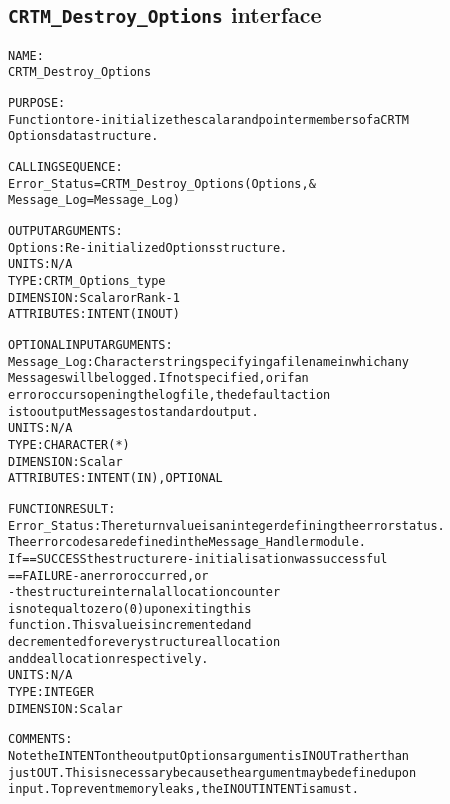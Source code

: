 \subsection{\texttt{CRTM\_Destroy\_Options} interface}
  \label{sec:CRTM_Destroy_Options_interface}
  \begin{alltt}
 
  NAME:
        CRTM_Destroy_Options
  
  PURPOSE:
        Function to re-initialize the scalar and pointer members of a CRTM
        Options data structure.
 
  CALLING SEQUENCE:
        Error_Status = CRTM_Destroy_Options( Options                , &
                                             Message_Log=Message_Log  )
  
  OUTPUT ARGUMENTS:
        Options:      Re-initialized Options structure.
                      UNITS:      N/A
                      TYPE:       CRTM_Options_type
                      DIMENSION:  Scalar or Rank-1
                      ATTRIBUTES: INTENT(IN OUT)
 
  OPTIONAL INPUT ARGUMENTS:
        Message_Log:  Character string specifying a filename in which any
                      Messages will be logged. If not specified, or if an
                      error occurs opening the log file, the default action
                      is to output Messages to standard output.
                      UNITS:      N/A
                      TYPE:       CHARACTER(*)
                      DIMENSION:  Scalar
                      ATTRIBUTES: INTENT(IN), OPTIONAL
 
  FUNCTION RESULT:
        Error_Status: The return value is an integer defining the error status.
                      The error codes are defined in the Message_Handler module.
                      If == SUCCESS the structure re-initialisation was successful
                         == FAILURE - an error occurred, or
                                    - the structure internal allocation counter
                                      is not equal to zero (0) upon exiting this
                                      function. This value is incremented and
                                      decremented for every structure allocation
                                      and deallocation respectively.
                      UNITS:      N/A
                      TYPE:       INTEGER
                      DIMENSION:  Scalar
 
  COMMENTS:
        Note the INTENT on the output Options argument is IN OUT rather than
        just OUT. This is necessary because the argument may be defined upon
        input. To prevent memory leaks, the IN OUT INTENT is a must.
 
  \end{alltt}
